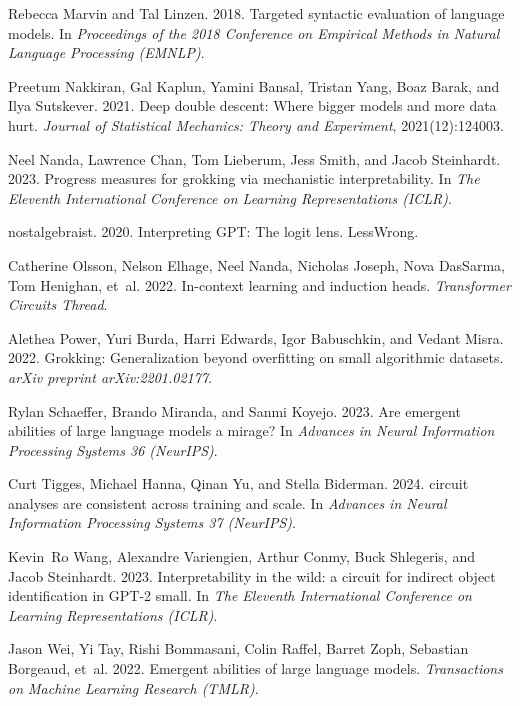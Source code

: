 \documentclass[11pt]{article}
\begin{document}
\begin{thebibliography}{}
Rebecca Marvin and Tal Linzen. 2018.
\newblock Targeted syntactic evaluation of language models.
\newblock In \emph{Proceedings of the 2018 Conference on Empirical Methods in
  Natural Language Processing (EMNLP)}.

Preetum Nakkiran, Gal Kaplun, Yamini Bansal, Tristan Yang, Boaz Barak, and Ilya
  Sutskever. 2021.
\newblock Deep double descent: Where bigger models and more data hurt.
\newblock \emph{Journal of Statistical Mechanics: Theory and Experiment},
  2021(12):124003.

Neel Nanda, Lawrence Chan, Tom Lieberum, Jess Smith, and Jacob Steinhardt.
  2023.
\newblock Progress measures for grokking via mechanistic interpretability.
\newblock In \emph{The Eleventh International Conference on Learning
  Representations (ICLR)}.

nostalgebraist. 2020.
\newblock Interpreting {GPT}: The logit lens.
\newblock LessWrong.

Catherine Olsson, Nelson Elhage, Neel Nanda, Nicholas Joseph, Nova DasSarma,
  Tom Henighan, et~al. 2022.
\newblock In-context learning and induction heads.
\newblock \emph{Transformer Circuits Thread}.

Alethea Power, Yuri Burda, Harri Edwards, Igor Babuschkin, and Vedant Misra.
  2022.
\newblock Grokking: Generalization beyond overfitting on small algorithmic
  datasets.
\newblock \emph{arXiv preprint arXiv:2201.02177}.

Rylan Schaeffer, Brando Miranda, and Sanmi Koyejo. 2023.
\newblock Are emergent abilities of large language models a mirage?
\newblock In \emph{Advances in Neural Information Processing Systems 36
  (NeurIPS)}.

Curt Tigges, Michael Hanna, Qinan Yu, and Stella Biderman. 2024.
 circuit analyses are consistent across training and scale.
\newblock In \emph{Advances in Neural Information Processing Systems 37
  (NeurIPS)}.

Kevin~Ro Wang, Alexandre Variengien, Arthur Conmy, Buck Shlegeris, and Jacob
  Steinhardt. 2023.
\newblock Interpretability in the wild: a circuit for indirect object
  identification in {GPT}-2 small.
\newblock In \emph{The Eleventh International Conference on Learning
  Representations (ICLR)}.

Jason Wei, Yi Tay, Rishi Bommasani, Colin Raffel, Barret Zoph, Sebastian
  Borgeaud, et~al. 2022.
\newblock Emergent abilities of large language models.
\newblock \emph{Transactions on Machine Learning Research (TMLR)}.

\end{thebibliography}
\end{document}
